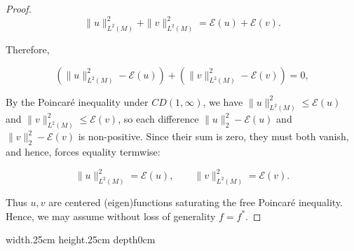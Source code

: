 \documentclass[10pt,a4paper,reqno]{amsart}
\def\qed{ \hfill \vrule width.25cm height.25cm depth0cm\smallskip}
\begin{document}
\begin{proof}
\[
\|u\|^2_{L^2(M)}+\|v\|^2_{L^2(M)}=\mathcal{E}(u)+\mathcal{E}(v).
\]


Therefore,


\[
(\|u\|^2_{L^2(M)}-\mathcal{E}(u))+(\|v\|^2_{L^2(M)}-\mathcal{E}(v))=0,
\]


By the Poincaré inequality under $CD(1,\infty)$, we have
$\|u\|_{L^2(M)}^2\le \mathcal{E}(u)$ and $\|v\|_{L^2(M)}^2\le \mathcal{E}(v)$, so each
difference $\|u\|_2^2-\mathcal{E}(u)$ and $\|v\|_2^2-\mathcal{E}(v)$ is
non-positive. Since their sum is zero, they must both vanish, and hence, forces equality termwise:


\[
\|u\|^2_{L^2(M)}=\mathcal{E}(u),\qquad \|v\|^2_{L^2(M)}=\mathcal{E}(v).
\]

\bigbreak
Thus $u,v$ are centered (eigen)functions saturating the free Poincaré inequality. Hence, we may assume without loss of generality $f=f^\ast$.
\end{proof}

\qed
\end{document}
